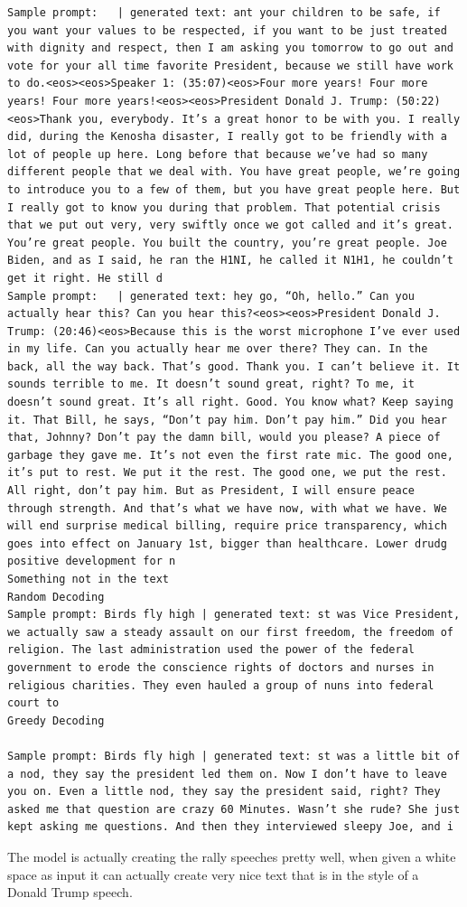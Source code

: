 \documentclass{article}
\begin{document}
\begin{lstlisting}
Sample prompt:   | generated text: ant your children to be safe, if you want your values to be respected, if you want to be just treated with dignity and respect, then I am asking you tomorrow to go out and vote for your all time favorite President, because we still have work to do.<eos><eos>Speaker 1: (35:07)<eos>Four more years! Four more years! Four more years!<eos><eos>President Donald J. Trump: (50:22)<eos>Thank you, everybody. It’s a great honor to be with you. I really did, during the Kenosha disaster, I really got to be friendly with a lot of people up here. Long before that because we’ve had so many different people that we deal with. You have great people, we’re going to introduce you to a few of them, but you have great people here. But I really got to know you during that problem. That potential crisis that we put out very, very swiftly once we got called and it’s great. You’re great people. You built the country, you’re great people. Joe Biden, and as I said, he ran the H1NI, he called it N1H1, he couldn’t get it right. He still d
Sample prompt:   | generated text: hey go, “Oh, hello.” Can you actually hear this? Can you hear this?<eos><eos>President Donald J. Trump: (20:46)<eos>Because this is the worst microphone I’ve ever used in my life. Can you actually hear me over there? They can. In the back, all the way back. That’s good. Thank you. I can’t believe it. It sounds terrible to me. It doesn’t sound great, right? To me, it doesn’t sound great. It’s all right. Good. You know what? Keep saying it. That Bill, he says, “Don’t pay him. Don’t pay him.” Did you hear that, Johnny? Don’t pay the damn bill, would you please? A piece of garbage they gave me. It’s not even the first rate mic. The good one, it’s put to rest. We put it the rest. The good one, we put the rest. All right, don’t pay him. But as President, I will ensure peace through strength. And that’s what we have now, with what we have. We will end surprise medical billing, require price transparency, which goes into effect on January 1st, bigger than healthcare. Lower drudg positive development for n
Something not in the text
Random Decoding
Sample prompt: Birds fly high | generated text: st was Vice President, we actually saw a steady assault on our first freedom, the freedom of religion. The last administration used the power of the federal government to erode the conscience rights of doctors and nurses in religious charities. They even hauled a group of nuns into federal court to 
Greedy Decoding

Sample prompt: Birds fly high | generated text: st was a little bit of a nod, they say the president led them on. Now I don’t have to leave you on. Even a little nod, they say the president said, right? They asked me that question are crazy 60 Minutes. Wasn’t she rude? She just kept asking me questions. And then they interviewed sleepy Joe, and i
\end{lstlisting}
The model is actually creating the rally speeches pretty well, when given a white space as input it can actually create very nice text that is in the style of a Donald Trump speech.
\clearpage
\end{document}
